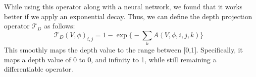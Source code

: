 While using this operator along with a neural network, we found that it works better if we apply an exponential decay.
Thus, we can define the depth projection operator $\mathcal{T}_D$ as follows:
\begin{equation}
\label{eq:expdepth}
\mathcal{T}_D(V, \phi)_{i,j} = 1 - \exp\bigg\{-\sum_{k}A(V,\phi,i,j,k)\bigg\}
\end{equation}
This smoothly maps the depth value to the range between [0,1]. Specifically, it maps a depth value of 0 to 0, and infinity to 1, while still remaining a differentiable operator.
